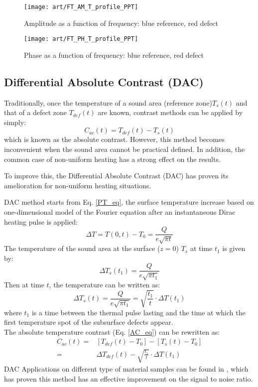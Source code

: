 \begin{figure}[!h]
	\centering
	\texttt{[image: art/FT\_AM\_T\_profile\_PPT]}
	\caption{Amplitude as a function of frequency: blue reference, red defect}
	\label{FT_AM_profile_PPT}
\end{figure}

\begin{figure}[!h]
	\centering
	\texttt{[image: art/FT\_PH\_T\_profile\_PPT]}
	\caption{Phase as a function of frequency: blue reference, red defect}
	\label{FT_PH_profile_PPT}
\end{figure}

\subsection{Differential Absolute Contrast (DAC)}
Traditionally, once the temperature of a sound area (reference zone)$T_s(t) $ and that of a defect zone $T_{def}(t) $ are known, contrast methods can be applied by simply:
\begin{equation}
C_{ac}(t) = T_{def}(t) - T_s(t)
\label{AC_eq}
\end{equation}
which is known as the absolute contrast. However, this method becomes inconvenient when the sound area cannot be practical defined. In addition, the common case of non-uniform heating has a strong effect on the results.

To improve this, the Differential Absolute Contrast (DAC) has proven its amelioration for non-uniform heating situations\citep{Benitez2008, pilla2002new}.

DAC method starts from Eq. \ref{PT_eq}, the surface temperature increase based on one-dimensional model of the Fourier equation after an instantaneous Dirac heating pulse is applied:
\begin{equation}
\Delta T = T(0,t) - T_0  = \frac{Q}{e\sqrt{\pi t}}
\label{PT_eq_2}
\end{equation}
The temperature of the sound area at the surface ($z=0$) $T_s$ at time $t_1$ is given by:
\begin{equation}
\Delta T_s(t_1) = \frac{Q}{e\sqrt{\pi t_1}}
\end{equation}
Then at time $t$, the temperature can be written as:
\begin{equation}
\Delta T_s(t) = \frac{Q}{e\sqrt{\pi t_1}} = \sqrt{\frac{t_1}{t}}\cdot \Delta T(t_1)
\end{equation}
where $t_1$ is a time between the thermal pulse lasting and the time at which the first temperature spot of the subsurface defects appear.\\
The absolute temperature contrast (Eq. \ref{AC_eq}) can be rewritten as:
\begin{align}
C_{ac}(t) = & [T_{def}(t) -T_0] - [T_s(t) - T_0] \\ 
= & \Delta T_{def}(t) - \sqrt{\frac{t_1}{t}}\cdot \Delta T(t_1)
\end{align}
DAC Applications on different type of material samples can be found in \citep{pilla2002new}, which has proven this method has an effective improvement on the signal to noise ratio.

